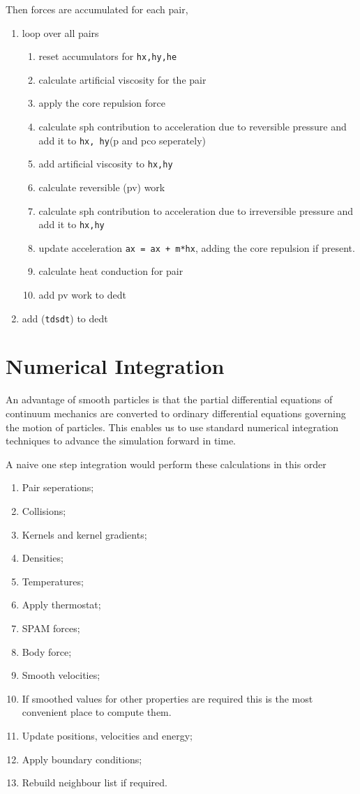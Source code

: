 Then forces are accumulated for each pair,
\begin{enumerate}
\item loop over all pairs

    \begin{enumerate}
    \item reset accumulators for  \texttt{hx,hy,he}
    \item calculate artificial viscosity for the pair
    \item apply the core repulsion force
    \item calculate sph contribution to acceleration due to reversible pressure
        and add it to \texttt{hx, hy}(p and pco seperately)
    \item add artificial viscosity to \texttt{hx,hy}
    \item calculate reversible (pv) work
    \item calculate sph contribution to acceleration due to irreversible
        pressure and add it to \texttt{hx,hy}
    \item update acceleration \texttt{ax = ax + m*hx}, adding the core repulsion if present.
    \item calculate heat conduction for pair
    \item add pv work to dedt
    \end{enumerate}
	  
\item add (\texttt{tdsdt}) to dedt 
 
\end{enumerate}

\section{Numerical Integration}
An advantage of smooth particles is that the partial differential equations of
continuum mechanics are converted to ordinary differential equations governing
the motion of particles. This enables us to use standard numerical integration
techniques to advance the simulation forward in time.

A naive one step integration would perform these calculations in this order
\begin {enumerate}
\item Pair seperations; 
\item Collisions; 
\item Kernels and kernel gradients; 
\item Densities; 
\item Temperatures; 
\item Apply thermostat; 
\item SPAM forces; 
\item Body force;
\item Smooth velocities;
\item If smoothed values for other properties are required this is the most
    convenient place to compute them.
\item Update positions, velocities and energy; 
\item Apply boundary conditions; 
\item Rebuild neighbour list if required.
\end{enumerate}


